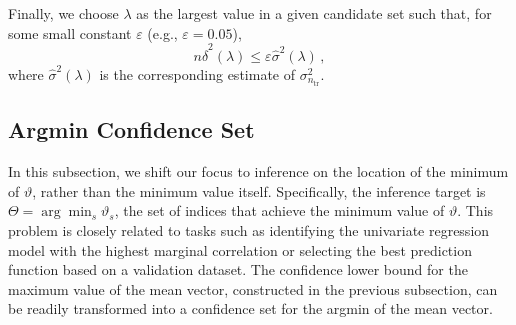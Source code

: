 \documentclass[11pt]{article}
\theoremstyle{plain}
\newcommand{\tr}{{\mathrm{tr}}}
\begin{document}
Finally, we choose $\lambda$ as the largest value in a given candidate set such that,
for some small constant $\varepsilon$ (e.g., $\varepsilon=0.05$),
$$n\hat\delta^2(\lambda)\le \varepsilon \hat\sigma^2(\lambda)\,,$$
where $\hat\sigma^2(\lambda)$ is the corresponding estimate of $\sigma_{n_\tr}^2$.


\subsection{Argmin Confidence Set}\label{subsec:5.4-argmin-conf}
In this subsection, we shift our focus to inference on the location of the minimum of $\vartheta$, rather than the minimum value itself. Specifically, the inference target is $\Theta = \arg\min_s \vartheta_s$, the set of indices that achieve the minimum value of $\vartheta$. This problem is closely related to tasks such as identifying the univariate regression model with the highest marginal correlation or selecting the best prediction function based on a validation dataset. The confidence lower bound for the maximum value of the mean vector, constructed in the previous subsection, can be readily transformed into a confidence set for the argmin of the mean vector.
\end{document}
